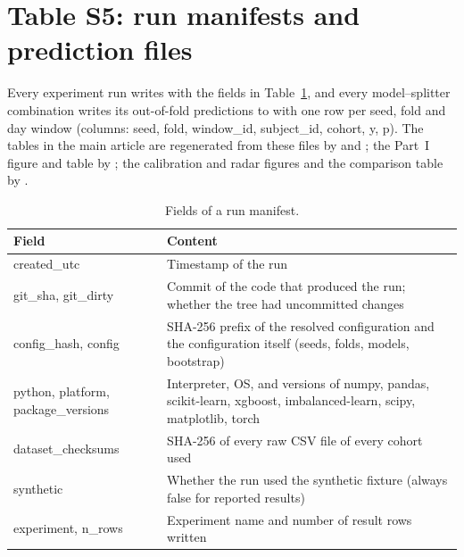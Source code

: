 \documentclass[11pt,a4paper]{article}
\begin{document}
\section{Table S5: run manifests and prediction files}
Every experiment run writes  with the fields in
Table~\ref{tab:manifest}, and every model--splitter combination writes its out-of-fold predictions
to  with one row per
seed, fold and day window (columns: seed, fold, window\_id, subject\_id, cohort, y, p). The tables
in the main article are regenerated from these files by  and
; the Part~I figure and table by ;
the calibration and radar figures and the comparison table by .
\begin{table}[!htbp]\centering\caption{Fields of a run manifest.}\label{tab:manifest}\footnotesize
\begin{tabular}{ll}\toprule Field & Content\\\midrule
created\_utc & Timestamp of the run\\
git\_sha, git\_dirty & Commit of the code that produced the run; whether the tree had uncommitted changes\\
config\_hash, config & SHA-256 prefix of the resolved configuration and the configuration itself (seeds, folds, models, bootstrap)\\
python, platform, package\_versions & Interpreter, OS, and versions of numpy, pandas, scikit-learn, xgboost, imbalanced-learn, scipy, matplotlib, torch\\
dataset\_checksums & SHA-256 of every raw CSV file of every cohort used\\
synthetic & Whether the run used the synthetic fixture (always false for reported results)\\
experiment, n\_rows & Experiment name and number of result rows written\\
\bottomrule\end{tabular}\end{table}
\end{document}
